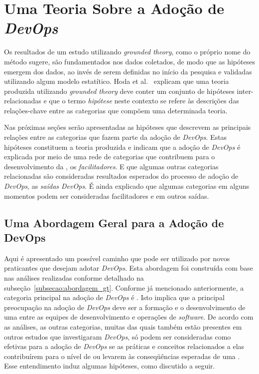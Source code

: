 \section{Uma Teoria Sobre a Adoção de \textit{DevOps}}\label{secao_teoria}

Os resultados de um estudo utilizando {\it grounded theory}, como o próprio
nome do método sugere, são fundamentados nos dados coletados, de modo que as
hipóteses emergem dos dados, ao invés de serem definidas no início da pesquisa
e validadas utilizando algum modelo estatítico. Hoda et al.~\cite{hoda2017becoming}
explicam que uma teoria produzida utilizando \emph{grounded theory} deve conter
um conjunto de hipóteses inter-relacionadas e que o termo \emph{hipótese} neste
contexto se refere às descrições das relações-chave entre as categorias que
compõem uma determinada teoria.

Nas próximas seções serão apresentadas as hipóteses que descrevem as principais
relações entre as categorias que fazem parte da adoção de {\it DevOps}. Estas
hipóteses constituem a teoria produzida e indicam que a adoção
de {\it DevOps} é explicada por meio de uma rede de categorias que contribuem
para o desenvolvimento da \cc, os \emph{facilitadores}. E que algumas outras
categorias relacionadas são consideradas resultados esperados do processo de
adoção de {\it DevOps}, as \emph{saídas DevOps}. É ainda explicado que algumas
categorias em alguns momentos podem ser consideradas facilitadores e em outros
saídas.

\subsection{Uma Abordagem Geral para a Adoção de DevOps}

Aqui é apresentado um possível caminho que pode ser utilizado por
novos praticantes que desejam adotar {\it DevOps}. Esta abordagem foi construída
com base nas análises realizadas conforme detalhado na subseção~\ref{subsecao:abordagem_gt}.
Conforme já mencionado anteriormente, a categoria principal na adoção de {\it DevOps}
é \cc. Isto implica que a principal preocupação na adoção de {\it DevOps} deve
ser a formação e o desenvolvimento de uma \cc entre as equipes de desenvolvimento
e operações de {\it software}. De acordo com as análises, as outras categorias,
muitas das quais também estão presentes em outros estudos que investigaram
{\it DevOps}, só podem ser consideradas como efetivas para a adoção de {\it DevOps}
se as práticas e conceitos relacionados a elas contribuírem para o nível de \cc
ou levarem às conseqüências esperadas de uma \cc. Esse entendimento induz algumas
hipóteses, como discutido a seguir.

